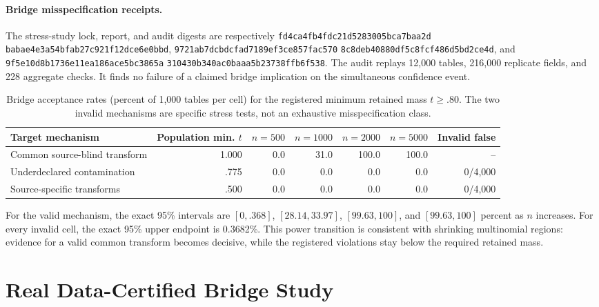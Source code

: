 \begingroup\raggedright
\paragraph{Bridge misspecification receipts.}
The stress-study lock, report, and audit digests are respectively
\texttt{fd4ca4fb4fdc21d5283005bca7baa2d}\allowbreak
\texttt{babae4e3a54bfab27c921f12dce6e0bbd},
\texttt{9721ab7dcbdcfad7189ef3ce857fac570}\allowbreak
\texttt{8c8deb40880df5c8fcf486d5bd2ce4d}, and
\texttt{9f5e10d8b1736e11ea186ace5bc3865a}\allowbreak
\texttt{310430b340ac0baaa5b23738ffb6f538}. The audit replays 12,000 tables,
216,000 replicate fields, and 228 aggregate checks. It finds no failure of a
claimed bridge implication on the simultaneous confidence event.\par
\endgroup

\begin{table}[t]
\centering
\small
\setlength{\tabcolsep}{5.2pt}
\begin{tabular}{lrrrrrr}
\hline
Target mechanism & Population min. $t$ & $n=500$ & $n=1000$ & $n=2000$ & $n=5000$ & Invalid false \\
\hline
Common source-blind transform & 1.000 & 0.0 & 31.0 & 100.0 & 100.0 & -- \\
Underdeclared contamination & .775 & 0.0 & 0.0 & 0.0 & 0.0 & 0/4,000 \\
Source-specific transforms & .500 & 0.0 & 0.0 & 0.0 & 0.0 & 0/4,000 \\
\hline
\end{tabular}
\caption{Bridge acceptance rates (percent of 1,000 tables per cell) for the
registered minimum retained mass $t\geq.80$. The two invalid mechanisms are
specific stress tests, not an exhaustive misspecification class.}
\label{supp:tab:bridge-misspecification}
\end{table}

For the valid mechanism, the exact 95\% intervals are $[0,.368]$,
$[28.14,33.97]$, $[99.63,100]$, and $[99.63,100]$ percent as $n$ increases.
For every invalid cell, the exact 95\% upper endpoint is 0.3682\%. This power
transition is consistent with shrinking multinomial regions: evidence for a
valid common transform becomes decisive, while the registered violations stay
below the required retained mass.

\section{Real Data-Certified Bridge Study}

